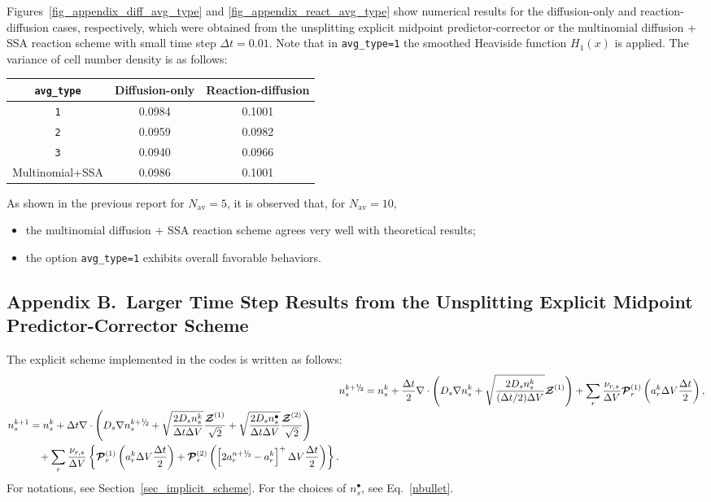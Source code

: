 \documentclass{article}
\def\mZb {\bm{\mathcal{Z}}}
\def\mPb {\bm{\mathcal{P}}}
\def\myhalf {\sfrac{1}{2}}
\newcommand{\sfrac}[2]{\mathchoice
  {\kern0em\raise.5ex\hbox{\the\scriptfont0 #1}\kern-.15em/
   \kern-.15em\lower.25ex\hbox{\the\scriptfont0 #2}}
  {\kern0em\raise.5ex\hbox{\the\scriptfont0 #1}\kern-.15em/
   \kern-.15em\lower.25ex\hbox{\the\scriptfont0 #2}}
  {\kern0em\raise.5ex\hbox{\the\scriptscriptfont0 #1}\kern-.2em/
   \kern-.15em\lower.25ex\hbox{\the\scriptscriptfont0 #2}}
  {#1\!/#2}}
\begin{document}
Figures~\ref{fig_appendix_diff_avg_type} and \ref{fig_appendix_react_avg_type} show numerical results for the diffusion-only and reaction-diffusion cases, respectively, which were obtained from the unsplitting explicit midpoint predictor-corrector or the multinomial diffusion + SSA reaction scheme with small time step $\Delta t=0.01$.
Note that in \texttt{avg\_type=1} the smoothed Heaviside function $H_1(x)$ is applied.
The variance of cell number density is as follows:
\begin{center}
{\tabulinesep=1.2mm
\begin{tabu}{|c|c|c|}
\hline
\texttt{avg\_type} & Diffusion-only & Reaction-diffusion \\
\hline
\texttt{1} & 0.0984 & 0.1001 \\
\hline
\texttt{2} & 0.0959 & 0.0982 \\
\hline
\texttt{3} & 0.0940 & 0.0966 \\
\hline
Multinomial+SSA & 0.0986 & 0.1001 \\
\hline
\end{tabu}
}
\end{center}

As shown in the previous report for $N_\mathrm{av}=5$, it is observed that, for $N_\mathrm{av}=10$,
\begin{itemize}
\item the multinomial diffusion + SSA reaction scheme agrees very well with theoretical results;
\item the option \texttt{avg\_type=1} exhibits overall favorable behaviors.
\end{itemize}

\clearpage

\subsection*{Appendix B.~Larger Time Step Results from the Unsplitting Explicit Midpoint Predictor-Corrector Scheme}

The explicit scheme implemented in the codes is written as follows:
\begin{subequations}
\begin{align}
&n_s^{k+\myhalf} = n_s^k + \frac{\Delta t}{2} \nabla\cdot\left(D_s\nabla n_s^k
+ \sqrt{\frac{2 D_s n_s^k}{(\Delta t/2)\Delta V}}\mZb^{(1)}\right)
+\sum_r \frac{\nu_{r,s}}{\Delta V}\mPb^{(1)}_r\left(a_r^k\Delta V\frac{\Delta t}{2}\right),\\
\begin{split}
&n_s^{k+1} = n_s^k + \Delta t \nabla\cdot\left(D_s \nabla n_s^{k+\myhalf}
+ \sqrt{\frac{2 D_s n_s^k}{\Delta t\Delta V}}\frac{\mZb^{(1)}}{\sqrt{2}}
+ \sqrt{\frac{2 D_s n_s^\bullet}{\Delta t\Delta V}}\frac{\mZb^{(2)}}{\sqrt{2}}\right)\\
&\quad\quad\quad+\sum_r \frac{\nu_{r,s}}{\Delta V}\left\{
\mPb^{(1)}_r\left(a_r^k\Delta V\frac{\Delta t}{2}\right)
+\mPb^{(2)}_r\left(\left[2 a_r^{n+\myhalf}-a_r^k\right]^+\Delta V\frac{\Delta t}{2}\right)\right\}.
\end{split}
\end{align}
\end{subequations}
For notations, see Section~\ref{sec_implicit_scheme}.
For the choices of $n_s^\bullet$, see Eq.~\eqref{nbullet}.
\end{document}
